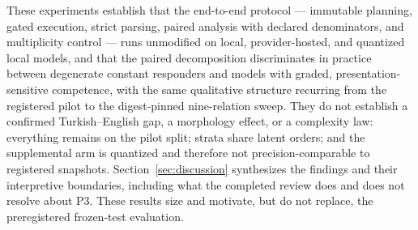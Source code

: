These experiments establish that the end-to-end protocol --- immutable planning, gated execution, strict
parsing, paired analysis with declared denominators, and multiplicity control --- runs unmodified on local,
provider-hosted, and quantized local models, and that the paired decomposition discriminates in practice
between degenerate constant responders and models with graded, presentation-sensitive competence, with the
same qualitative structure recurring from the registered pilot to the digest-pinned nine-relation sweep.
They do not establish a confirmed Turkish--English gap, a morphology effect, or a complexity law:
everything remains on the pilot split; strata share latent orders; and the supplemental arm is quantized
and therefore not precision-comparable to registered snapshots. Section~\ref{sec:discussion} synthesizes
the findings and their interpretive boundaries, including what the completed review does and does not
resolve about P3. These results size and motivate, but do not replace, the preregistered frozen-test
evaluation.

